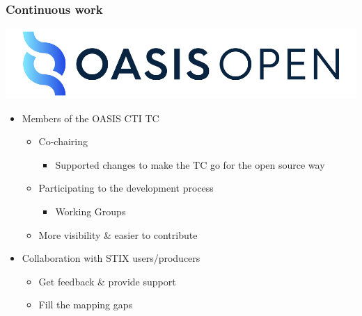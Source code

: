 \begin{frame}
\begin{minipage}{0.3\textwidth}
    \end{minipage}
\end{frame}

\begin{frame}
    \frametitle{Continuous work}
    \begin{center}
        \includegraphics[scale=0.2]{images/oasis.png}
    \end{center}
    \begin{itemize}
        \item Members of the OASIS CTI TC
        \begin{itemize}
            \item Co-chairing
            \begin{itemize}
                \item Supported changes to make the TC go for the open source way
            \end{itemize}
            \item Participating to the development process
            \begin{itemize}
                \item Working Groups
            \end{itemize}
            \item More visibility \& easier to contribute
        \end{itemize}
        \item Collaboration with STIX users/producers
        \begin{itemize}
            \item Get feedback \& provide support
            \item Fill the mapping gaps
        \end{itemize}
    \end{itemize}
\end{frame}

